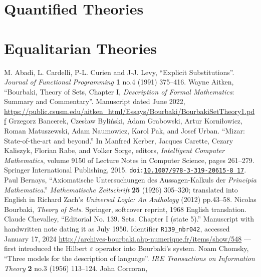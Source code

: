 \documentclass{amsart}
\begin{document}
\section{Quantified Theories}




\section{Equalitarian Theories}


\begin{thebibliography}{99}
  M. Abadi, L. Cardelli, P-L. Curien and J-J. Levy,
  ``Explicit Substitutions''.
  \textit{Journal of Functional Programming} \textbf{1} no.4 (1991) 375--416.
 Wayne Aitken,
  ``Bourbaki, Theory of Sets, Chapter I, \textit{Description of Formal Mathematics}: Summary and Commentary''.
  Manuscript dated June 2022,
  \url{https://public.csusm.edu/aitken_html/Essays/Bourbaki/BourbakiSetTheory1.pdf}
 Grzegorz Bancerek, Czesław Byli\'{n}ski, Adam Grabowski, Artur Korni\l{}owicz, Roman Matuszewski, Adam Naumowicz, Karol Pak, and Josef Urban.
  ``Mizar: State-of-the-art and beyond.''
  In Manfred Kerber, Jacques Carette, Cezary Kaliszyk, Florian Rabe, and Volker Sorge, editors, \textit{Intelligent Computer Mathematics}, volume 9150 of Lecture Notes in Computer Science, pages 261--279. Springer International Publishing, 2015. \texttt{doi:\href{http://dx.doi.org/10.1007/978-3-319-20615-8_17}{10.1007/978-3-319-20615-8 17}}.
 Paul Bernays, ``Axiomatische Untersuchungen des
Aussagen-Kalkuls der \textit{Principia Mathematica}.''
\textit{Mathematische Zeitschrift} \textbf{25} (1926) 305--320;
translated into English in Richard Zach's \textit{Universal Logic: An
  Anthology} (2012) pp.43--58.
 Nicolas Bourbaki,
  \textit{Theory of Sets}.
  Springer, softcover reprint, 1968 English translation.
  Claude Chevalley, ``Editorial No. 139. Sets. Chapter I (state 5).''
  Manuscript with handwritten note dating it as July 1950.
  Identifier \verb#R139_nbr042#, accessed January 17, 2024 \url{http://archives-bourbaki.ahp-numerique.fr/items/show/548}
  --- first introduced the Hilbert $\varepsilon$ operator into Bourbaki's system.
  Noam Chomsky,
  ``Three models for the description of language''.
  \textit{IRE Transactions on Information Theory} \textbf{2} no.3 (1956) 113--124.
  John Corcoran,

\end{thebibliography}
\end{document}
